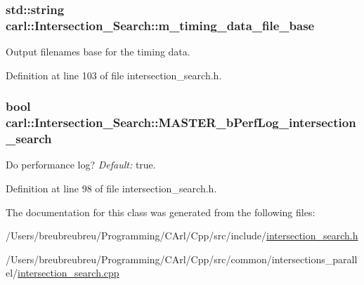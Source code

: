 \subsubsection[{m\+\_\+timing\+\_\+data\+\_\+file\+\_\+base}]{\setlength{\rightskip}{0pt plus 5cm}std\+::string carl\+::\+Intersection\+\_\+\+Search\+::m\+\_\+timing\+\_\+data\+\_\+file\+\_\+base\hspace{0.3cm}{\ttfamily [protected]}}\label{classcarl_1_1_intersection___search_aea1aa01a86b5cdb7bea5ac9e7f73105f}


Output filenames base for the timing data. 



Definition at line 103 of file intersection\+\_\+search.\+h.

\hypertarget{classcarl_1_1_intersection___search_a0b83cc0d7b90bae06f01a53555c0fc97}{}
\subsubsection[{M\+A\+S\+T\+E\+R\+\_\+b\+Perf\+Log\+\_\+intersection\+\_\+search}]{\setlength{\rightskip}{0pt plus 5cm}bool carl\+::\+Intersection\+\_\+\+Search\+::\+M\+A\+S\+T\+E\+R\+\_\+b\+Perf\+Log\+\_\+intersection\+\_\+search\hspace{0.3cm}{\ttfamily [protected]}}\label{classcarl_1_1_intersection___search_a0b83cc0d7b90bae06f01a53555c0fc97}


Do performance log? {\itshape Default\+:} true. 



Definition at line 98 of file intersection\+\_\+search.\+h.



The documentation for this class was generated from the following files\+:\begin{DoxyCompactItemize}
\item 
/\+Users/breubreubreu/\+Programming/\+C\+Arl/\+Cpp/src/include/\hyperlink{intersection__search_8h}{intersection\+\_\+search.\+h}\item 
/\+Users/breubreubreu/\+Programming/\+C\+Arl/\+Cpp/src/common/intersections\+\_\+parallel/\hyperlink{intersection__search_8cpp}{intersection\+\_\+search.\+cpp}\end{DoxyCompactItemize}
